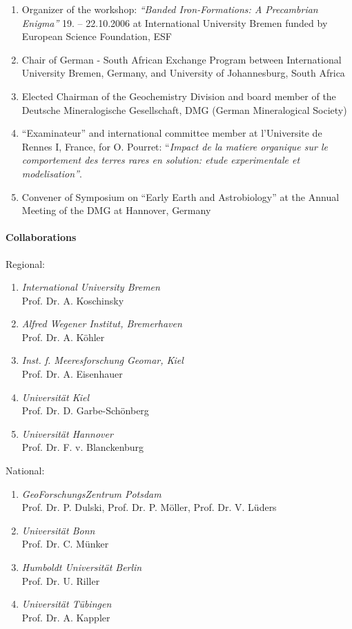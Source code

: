\begin{enumerate}
\item Organizer of the workshop: \textit{``Banded Iron-Formations: A
Precambrian Enigma''} 19. -- 22.10.2006 at International University
Bremen funded by European Science Foundation, ESF

\item Chair of German - South African Exchange Program between International
University Bremen, Germany, and University of Johannesburg, South
Africa

\item Elected Chairman of the Geochemistry Division and board member of the
Deutsche Mineralogische Gesellschaft, DMG (German Mineralogical
Society)

\item ``Examinateur''  and international committee member at l'Universite de Rennes I, France, for O. Pourret: ``\textit{Impact de la matiere organique sur le comportement des terres rares en solution: etude experimentale et modelisation''}.

\item Convener of Symposium on ``Early Earth and Astrobiology'' at the
Annual Meeting of the DMG at Hannover, Germany

\end{enumerate}

\paragraph{Collaborations}
\noindent

Regional:
\begin{enumerate}
\item {\sl International University Bremen}\\ Prof. Dr. A. Koschinsky
\item {\sl Alfred Wegener Institut, Bremerhaven}\\ Prof. Dr. A. K\"ohler
\item {\sl Inst. f. Meeresforschung Geomar, Kiel}\\ Prof. Dr. A. Eisenhauer
\item {\sl Universit\"at Kiel}\\ Prof. Dr. D. Garbe-Sch\"onberg
\item {\sl  Universit\"at Hannover}\\ Prof. Dr. F. v. Blanckenburg
\end{enumerate}

National:
\begin{enumerate}
\item {\sl GeoForschungsZentrum Potsdam}\\ Prof. Dr. P. Dulski, Prof. Dr. P. M\"oller, Prof. Dr. V. L\"uders
\item {\sl Universit\"at Bonn}\\ Prof. Dr. C. M\"unker
\item {\sl Humboldt Universit\"at Berlin}\\Prof. Dr. U. Riller
\item {\sl Universit\"at T\"ubingen}\\ Prof. Dr. A. Kappler
\end{enumerate}

